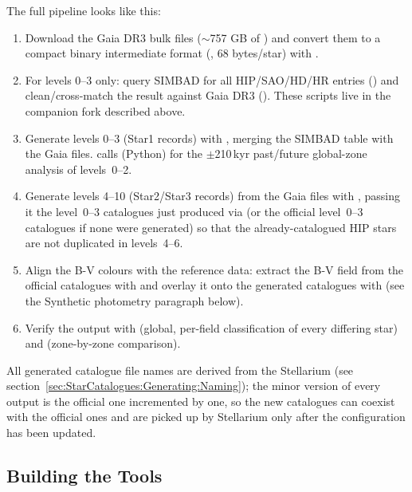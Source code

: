The full pipeline looks like this:

\begin{enumerate}
  \item Download the Gaia DR3 bulk files ($\sim$757 GB of )
        and convert them to a compact binary intermediate format (,
        68 bytes/star) with .
  \item For levels 0--3 only: query SIMBAD for all HIP/SAO/HD/HR entries
        () and clean/cross-match the
        result against Gaia DR3 ().
        These scripts live in the companion fork described above.
  \item Generate levels 0--3 (Star1 records) with ,
        merging the SIMBAD table with the Gaia  files.
         calls  (Python) for the
        $\pm$210\,kyr past/future global-zone analysis of levels~0--2.
  \item Generate levels 4--10 (Star2/Star3 records) from the Gaia
         files with , passing it the
        level~0--3 catalogues just produced via 
        (or the official level~0--3 catalogues if none were generated) so that the already-catalogued HIP stars are not duplicated in
        levels~4--6.
  \item [Optional] Align the B-V colours with the reference data: extract
        the B-V field from the official catalogues with 
        and overlay it onto the generated catalogues with 
        (see the Synthetic photometry paragraph below).
  \item Verify the output with  (global,
        per-field classification of every differing star) and
         (zone-by-zone comparison).
\end{enumerate}

All generated catalogue file names are derived from the Stellarium
 (see
section~\ref{sec:StarCatalogues:Generating:Naming}); the minor version of
every output is the official one incremented by one, so the new catalogues
can coexist with the official ones and are picked up by Stellarium only
after the configuration has been updated.

\subsection{Building the Tools}
\label{sec:StarCatalogues:Generating:Build}

